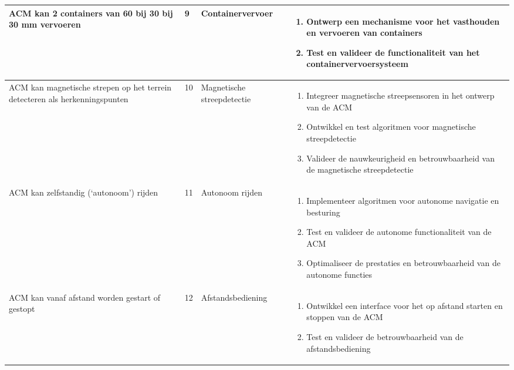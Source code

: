 \begin{longtable}{@{}p{4cm}p{2cm}p{3cm}p{5cm}@{}}
    ACM kan 2 containers van 60 bij 30 bij 30 mm vervoeren                                                 & 9            & Containervervoer              &
    \begin{enumerate}[nosep, leftmargin=*]
        \item Ontwerp een mechanisme voor het vasthouden en vervoeren van containers
        \item Test en valideer de functionaliteit van het containervervoersysteem \
    \end{enumerate}                                                                                   \\
    \midrule

    ACM kan magnetische strepen op het terrein detecteren als herkenningspunten                            & 10           & Magnetische streepdetectie    &
    \begin{enumerate}[nosep, leftmargin=*]
        \item Integreer magnetische streepsensoren in het ontwerp van de ACM
        \item Ontwikkel en test algoritmen voor magnetische streepdetectie
        \item Valideer de nauwkeurigheid en betrouwbaarheid van de magnetische streepdetectie \
    \end{enumerate}                                                                        \\
    \midrule

    ACM kan zelfstandig (‘autonoom’) rijden                                                                & 11           & Autonoom rijden               &
    \begin{enumerate}[nosep, leftmargin=*]
        \item Implementeer algoritmen voor autonome navigatie en besturing
        \item Test en valideer de autonome functionaliteit van de ACM
        \item Optimaliseer de prestaties en betrouwbaarheid van de autonome functies \
    \end{enumerate}                                                                                 \\
    \midrule

    ACM kan vanaf afstand worden gestart of gestopt                                                        & 12           & Afstandsbediening             &
    \begin{enumerate}[nosep, leftmargin=*]
        \item Ontwikkel een interface voor het op afstand starten en stoppen van de ACM
        \item Test en valideer de betrouwbaarheid van de afstandsbediening \
    \end{enumerate}                                                                                \\
    \midrule


\end{longtable}
